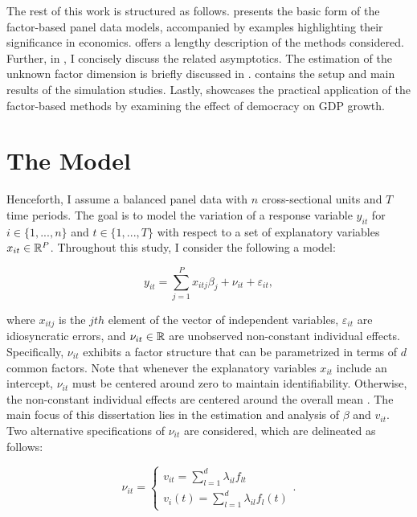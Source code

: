 The rest of this work is structured as follows.  presents the basic form of the factor-based panel data models, accompanied by examples highlighting their significance in economics.  offers a lengthy description of the methods considered. Further, in  , I concisely discuss the related asymptotics. The estimation of the unknown factor dimension is briefly discussed in .  contains the setup and main results of the simulation studies. Lastly,  showcases the practical application of the factor-based methods by examining the effect of democracy on \ac{GDP} growth.



\section{The Model}\label{section2}

Henceforth, I assume a balanced panel data with $n$ cross-sectional units and $T$ time periods. The goal is to model the variation of a response variable $y_{it}$ for  $i \in \{1, ..., n\}$ and $t \in \{1, ..., T\}$ with respect to a set of explanatory variables $x_{it} \in \mathbb{R}^P$. Throughout this study, I consider the following a model:


\begin{equation}\label{model1}
    y_{it} = \sum_{j=1}^P x_{itj}\beta_j + \nu_{it} + \varepsilon_{it},
\end{equation}

where $x_{itj}$ is the $jth$ element of the vector of independent variables, $\varepsilon_{it}$ are idiosyncratic errors, and $\nu_{it} \in \mathbb{R} $ are unobserved non-constant individual effects. Specifically,  $\nu_{it}$ exhibits a factor structure that can be parametrized in terms of $d$ common factors. Note that whenever the explanatory variables $x_{it}$ include an intercept, $\nu_{it} $ must be centered around zero to maintain identifiability. Otherwise, the non-constant individual effects are centered around the overall mean \citep{kneip2012new, bada2012phtt}. The main focus of this dissertation lies in the estimation and analysis of $\beta$  and  $v_{it}$. Two alternative specifications of $\nu_{it}$ are considered, which are delineated as follows:

 
\begin{equation}\label{factors}
 \nu_{i t}=\left\{\begin{array}{c}v_{i t}=\sum_{l=1}^d \lambda_{i l} f_{l t} \\ v_i(t)=\sum_{l=1}^d \lambda_{i l} f_l(t)\end{array}\right. .
\end{equation}


